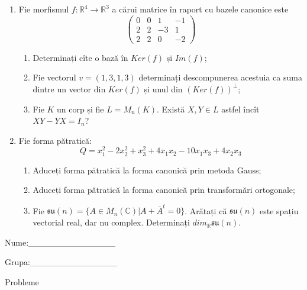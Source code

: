 \documentclass{article}
\begin{document}
\begin{enumerate}
 \item Fie morfismul $f:\mathbb{R}^4 \to \mathbb{R}^3$ a cărui matrice în raport cu bazele canonice este
$$\begin{pmatrix}
0&0&1&-1\\
2&2&-3&1\\
2&2&0&-2
\end{pmatrix}$$

\begin{enumerate}
\item Determinați cîte o bază în $Ker(f)$ și $Im(f)$;
\item Fie vectorul $v=(1,3,1,3)$ determinați descompunerea acestuia ca suma dintre un vector din $Ker(f)$ și unul din $(Ker(f))^\perp$;
\item Fie $K$ un corp și fie $L=M_n(K)$. Există $X,Y \in L$ astfel încît $XY-YX=I_n$?  
\end{enumerate}
\item Fie forma pătratică:
$$Q= x_1^2-2x_2^2+x_3^2+4x_1x_2-10x_1x_3+4x_2x_3$$

\begin{enumerate}
\item Aduceți forma pătratică la forma canonică prin metoda Gauss;
\item Aduceți forma pătratică la forma canonică prin transformări ortogonale;
\item Fie $\mathfrak{su}(n)=\{ A \in M_n(\mathbb{C}) | A+\bar{A}^t=0\}$. Arătați că $\mathfrak{su}(n)$ este spațiu vectorial real, dar nu complex.
Determinați $dim_{\mathbb{R}}\mathfrak{su}(n)$.
\end{enumerate}
\end{enumerate}
\newpage
\begin{flushright}
Nume:\_\_\_\_\_\_\_\_\_\_\_\_\_\_
 
 
Grupa:\_\_\_\_\_\_\_\_\_\_\_\_\_\_
\end{flushright}
\begin{center}
\vspace{2cm}
{\Large Probleme}
\vspace{2cm}
\end{center}
\end{document}
